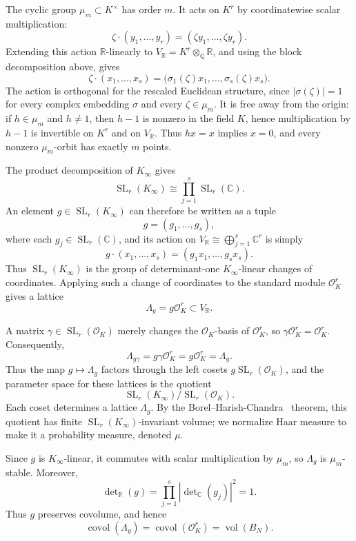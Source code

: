 \documentclass[11pt]{article}
\theoremstyle{remark}
\newcommand{\R}{\mathbb R}
\newcommand{\C}{\mathbb C}
\newcommand{\Q}{\mathbb Q}
\newcommand{\OK}{\mathcal O_K}
\newcommand{\vol}{\operatorname{vol}}
\newcommand{\covol}{\operatorname{covol}}
\begin{document}
The cyclic group $\mu_m\subset K^\times$ has order $m$.  It acts on $K^r$ by
coordinatewise scalar multiplication:
\[
        \zeta\cdot(y_1,\dots,y_r)
        =(\zeta y_1,\dots,\zeta y_r).
\]
Extending this action $\R$-linearly to $V_\R=K^r\otimes_\Q\R$, and using the
block decomposition above, gives
\[
        \zeta\cdot(x_1,\dots,x_s)
        =\bigl(\sigma_1(\zeta)x_1,\dots,\sigma_s(\zeta)x_s\bigr).
\]
The action is orthogonal for the rescaled Euclidean structure, since
$|\sigma(\zeta)|=1$ for every complex embedding $\sigma$ and every
$\zeta\in\mu_m$.  It is free away from the origin: if $h\in\mu_m$ and $h\ne1$,
then $h-1$ is nonzero in the field $K$, hence multiplication by $h-1$ is
invertible on $K^r$ and on $V_\R$.  Thus $hx=x$ implies $x=0$, and every
nonzero $\mu_m$-orbit has exactly $m$ points.

The product decomposition of $K_\infty$ gives
\[
        \operatorname{SL}_r(K_\infty)
        \cong\prod_{j=1}^s\operatorname{SL}_r(\C).
\]
An element $g\in\operatorname{SL}_r(K_\infty)$ can therefore be written as a
tuple
\[
        g=(g_1,\dots,g_s),
\]
where each $g_j\in\operatorname{SL}_r(\C)$,
and its action on $V_\R\cong\bigoplus_{j=1}^s\C^r$ is simply
\[
        g\cdot(x_1,\dots,x_s)=(g_1x_1,\dots,g_sx_s).
\]
Thus $\operatorname{SL}_r(K_\infty)$ is the group of determinant-one
$K_\infty$-linear changes of coordinates.  Applying such a change of
coordinates to the standard module $\OK^r$ gives a lattice
\[
        \Lambda_g=g\OK^r\subset V_\R.
\]

A matrix $\gamma\in\operatorname{SL}_r(\OK)$ merely changes the $\OK$-basis of
$\OK^r$, so $\gamma\OK^r=\OK^r$.  Consequently,
\[
        \Lambda_{g\gamma}=g\gamma\OK^r=g\OK^r=\Lambda_g.
\]
Thus the map $g\mapsto\Lambda_g$ factors through the left cosets
$g\operatorname{SL}_r(\OK)$, and the parameter space for these lattices is
the quotient
\[
        \operatorname{SL}_r(K_\infty)/\operatorname{SL}_r(\OK).
\]
Each coset determines a lattice $\Lambda_g$.  By the
Borel--Harish-Chandra~\cite{BorelHarishChandra} theorem, this quotient has
finite $\operatorname{SL}_r(K_\infty)$-invariant volume; we normalize Haar
measure to make it a probability measure, denoted $\mu$.

Since $g$ is $K_\infty$-linear, it commutes with scalar multiplication by
$\mu_m$, so $\Lambda_g$ is $\mu_m$-stable.  Moreover,
\[
        \det\nolimits_\R(g)=\prod_{j=1}^s|\det\nolimits_\C(g_j)|^2=1.
\]
Thus $g$ preserves covolume, and hence
\[
        \covol(\Lambda_g)=\covol(\OK^r)=\vol(B_N).
\]
\end{document}
